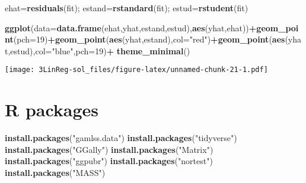 \documentclass[]{article}
\newenvironment{Shaded}{\begin{snugshade}}{\end{snugshade}}
\newcommand{\KeywordTok}[1]{\textcolor[rgb]{0.13,0.29,0.53}{\textbf{#1}}}
\newcommand{\DataTypeTok}[1]{\textcolor[rgb]{0.13,0.29,0.53}{#1}}
\newcommand{\DecValTok}[1]{\textcolor[rgb]{0.00,0.00,0.81}{#1}}
\newcommand{\StringTok}[1]{\textcolor[rgb]{0.31,0.60,0.02}{#1}}
\newcommand{\OperatorTok}[1]{\textcolor[rgb]{0.81,0.36,0.00}{\textbf{#1}}}
\newcommand{\NormalTok}[1]{#1}
\begin{document}
\begin{Shaded}
\begin{Highlighting}[]
\NormalTok{ehat=}\KeywordTok{residuals}\NormalTok{(fit); estand=}\KeywordTok{rstandard}\NormalTok{(fit); estud=}\KeywordTok{rstudent}\NormalTok{(fit)}

\KeywordTok{ggplot}\NormalTok{(}\DataTypeTok{data=}\KeywordTok{data.frame}\NormalTok{(ehat,yhat,estand,estud),}\KeywordTok{aes}\NormalTok{(yhat,ehat))}\OperatorTok{+}\KeywordTok{geom_point}\NormalTok{(}\DataTypeTok{pch=}\DecValTok{19}\NormalTok{)}\OperatorTok{+}\KeywordTok{geom_point}\NormalTok{(}\KeywordTok{aes}\NormalTok{(yhat,estand),}\DataTypeTok{col=}\StringTok{"red"}\NormalTok{)}\OperatorTok{+}\KeywordTok{geom_point}\NormalTok{(}\KeywordTok{aes}\NormalTok{(yhat,estud),}\DataTypeTok{col=}\StringTok{"blue"}\NormalTok{,}\DataTypeTok{pch=}\DecValTok{19}\NormalTok{)}\OperatorTok{+}\StringTok{  }\KeywordTok{theme_minimal}\NormalTok{()}
\end{Highlighting}
\end{Shaded}

\texttt{[image: 3LinReg-sol\_files/figure-latex/unnamed-chunk-21-1.pdf]}

\section{R packages}\label{r-packages}

\begin{Shaded}
\begin{Highlighting}[]
\KeywordTok{install.packages}\NormalTok{(}\StringTok{"gamlss.data"}\NormalTok{)}
\KeywordTok{install.packages}\NormalTok{(}\StringTok{"tidyverse"}\NormalTok{)}
\KeywordTok{install.packages}\NormalTok{(}\StringTok{"GGally"}\NormalTok{)}
\KeywordTok{install.packages}\NormalTok{(}\StringTok{"Matrix"}\NormalTok{)}
\KeywordTok{install.packages}\NormalTok{(}\StringTok{"ggpubr"}\NormalTok{)}
\KeywordTok{install.packages}\NormalTok{(}\StringTok{"nortest"}\NormalTok{)}
\KeywordTok{install.packages}\NormalTok{(}\StringTok{"MASS"}\NormalTok{)}
\end{Highlighting}
\end{Shaded}
\end{document}
